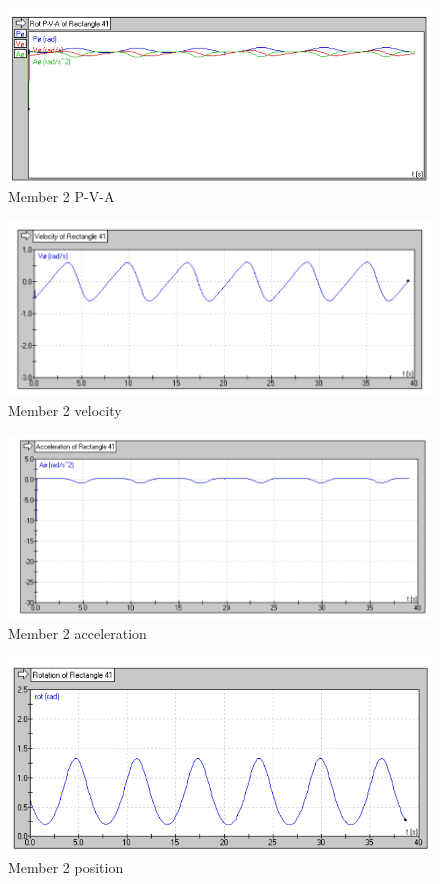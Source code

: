 \documentclass{article}
\begin{document}
\begin{figure}[H]
    \centering
    \includegraphics[width=0.7\linewidth]{Images/mem 2 rot.png}
    \caption{Member 2 P-V-A}
\end{figure}

\begin{figure}[H]
    \centering
    \includegraphics[width=0.7\linewidth]{Images/mem 2 vel.png}
    \caption{Member 2 velocity}
\end{figure}

\begin{figure}[H]
    \centering
    \includegraphics[width=0.7\linewidth]{Images/mem 2 acc.png}
    \caption{Member 2 acceleration}
\end{figure}

\begin{figure}[H]
    \centering
    \includegraphics[width=0.7\linewidth]{Images/mem 2 pos.png}
    \caption{Member 2 position}
\end{figure}
\end{document}
